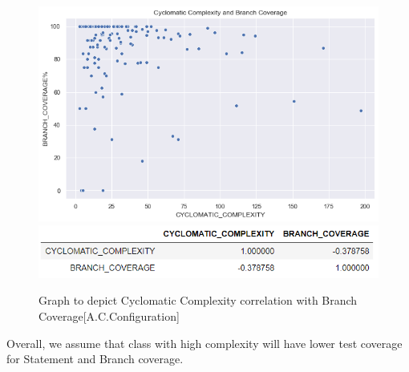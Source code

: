 \documentclass[letterpaper, 12 pt, conference]{ieeetran}  %
\begin{document}
\begin{figure}[H]
   \includegraphics[scale=0.40]{metric4 vs 2 commons-configuration.png}%
   \\ \includegraphics[scale=0.60]{metric4 vs 2 commons-config_spearmanr.png} %
    \caption{Graph to depict Cyclomatic Complexity correlation with Branch Coverage{\footnotesize[A.C.Configuration]}}
 \end{figure}
Overall, we assume that class with high complexity will have lower test coverage for Statement and Branch coverage.
\smallskip
\end{document}
